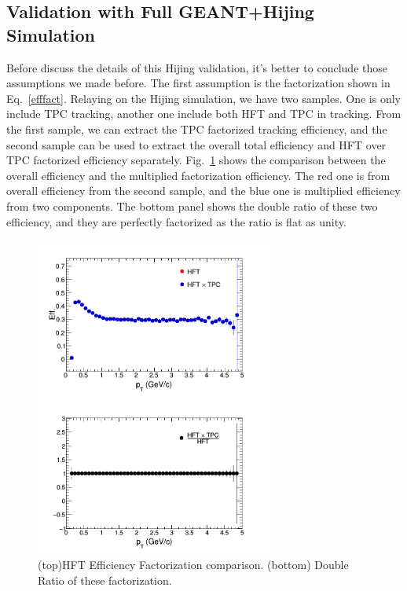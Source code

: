 \documentclass[a4paper]{article}
\begin{document}
\subsection{Validation with Full GEANT+Hijing Simulation}

Before discuss the details of this Hijing validation, it's better to conclude those assumptions we made before. The first assumption is the factorization shown in Eq.~\ref{efffact}. Relaying on the Hijing simulation, we have two samples. One is only include TPC tracking, another one include both HFT and TPC in tracking. From the first sample, we can extract the TPC factorized tracking efficiency, and the second sample can be used to extract the overall total efficiency and HFT over TPC factorized efficiency separately. Fig.~\ref{assumption01} shows the comparison between the overall efficiency and the multiplied factorization efficiency. The red one is from overall efficiency from the second sample, and the blue one is multiplied efficiency from two components. The bottom panel shows the double ratio of these two efficiency, and they are perfectly factorized as the ratio is flat as unity.

\begin{figure}[htbp]
\centering
\includegraphics[keepaspectratio,width=0.7\textwidth]{fig/assumption01.png}
\caption{(top)HFT Efficiency Factorization comparison. (bottom) Double Ratio of these factorization.}
\label{assumption01}
\end{figure}
\end{document}

